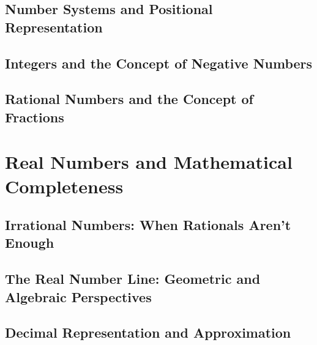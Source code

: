 \documentclass[12pt, oneside, openany]{book}
\begin{document}
\section{Number Systems and Positional Representation}

\section{Integers and the Concept of Negative Numbers}

\section{Rational Numbers and the Concept of Fractions}


\chapter{Real Numbers and Mathematical Completeness}

\section{Irrational Numbers: When Rationals Aren't Enough}

\section{The Real Number Line: Geometric and Algebraic Perspectives}

\section{Decimal Representation and Approximation}
\end{document}
